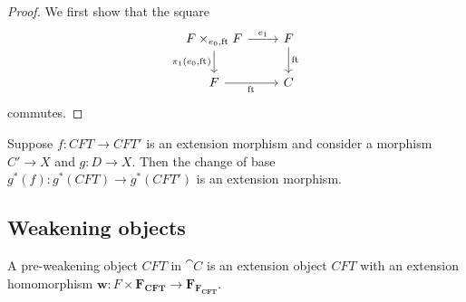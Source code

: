 \begin{proof}
We first show that the square
\begin{equation*}
\begin{tikzcd}
\stesysff 
  \ar{r}{\efamext} 
  \ar{d}[swap]{\pullbackpr{1}{\ectxext}{\eft}} 
  & 
\stesysf 
  \ar{d}{\eft}
  \\
\stesysf
  \ar{r}[swap]{\eft} 
  & 
\stesysc
\end{tikzcd}
\end{equation*}
commutes.
\end{proof}

\begin{lem}
Suppose $f:CFT\to CFT'$ is an extension morphism and consider a morphism
$C'\to X$ and $g:D\to X$. Then the change of base $g^\ast(f):g^\ast(CFT)\to
g^\ast(CFT')$ is an extension morphism.
\end{lem}

\subsection{Weakening objects}
\begin{defn}
A pre-weakening object $CFT$ in $\cat{C}$ is an extension object $CFT$ with 
an extension homomorphism $\mathbf{w}:F\times\mathbf{F_{CFT}}\to \mathbf{F_{F_{CFT}}}$.
\end{defn}

